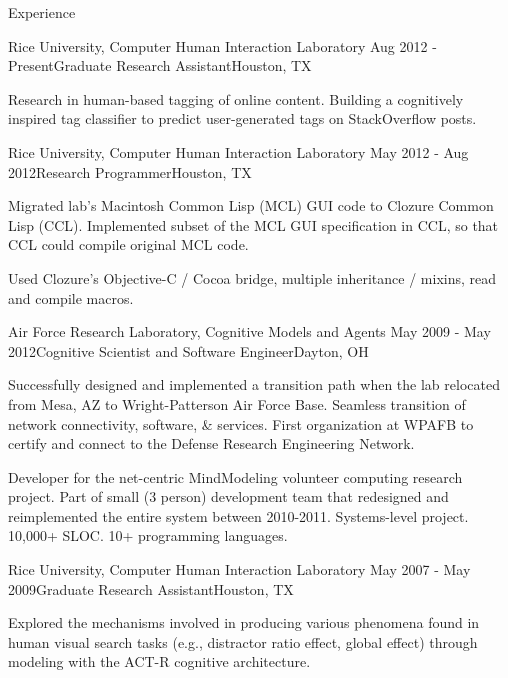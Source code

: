 
\begin{rSection}{Experience}

\begin{rSubsection}{Rice University, Computer Human Interaction Laboratory}
  {Aug 2012 - Present}{Graduate Research Assistant}{Houston, TX}
\item Research in human-based tagging of online content.
  Building a cognitively inspired tag classifier to predict user-generated tags on StackOverflow posts.
\end{rSubsection}

\begin{rSubsection}{Rice University, Computer Human Interaction Laboratory}
  {May 2012 - Aug 2012}{Research Programmer}{Houston, TX}
\item Migrated lab's Macintosh Common Lisp (MCL) GUI code to Clozure Common Lisp (CCL).
  Implemented subset of the MCL GUI specification in CCL, so that CCL could compile original MCL code.
\item Used Clozure's Objective-C / Cocoa bridge, multiple inheritance / mixins, read and compile macros.
\end{rSubsection}

\begin{rSubsection}{Air Force Research Laboratory, Cognitive Models and Agents}
  {May 2009 - May 2012}{Cognitive Scientist and Software Engineer}{Dayton, OH}
\item Successfully designed and implemented a transition path when the lab relocated from Mesa, AZ to Wright-Patterson Air Force Base. 
Seamless transition of network connectivity, software, \& services.
First organization at WPAFB to certify and connect to the Defense Research Engineering Network.
\item Developer for the net-centric MindModeling volunteer computing research project.
Part of small (3 person) development team that redesigned and reimplemented the entire system between 2010-2011.
Systems-level project. 10,000+ SLOC. 10+ programming languages.
\end{rSubsection}

\begin{rSubsection}{Rice University, Computer Human Interaction Laboratory}
  {May 2007 - May 2009}{Graduate Research Assistant}{Houston, TX}
\item Explored the mechanisms involved in producing various phenomena found in human visual search tasks
(e.g., distractor ratio effect, global effect) through modeling with the ACT-R cognitive architecture. 
\end{rSubsection}


\end{rSection}
